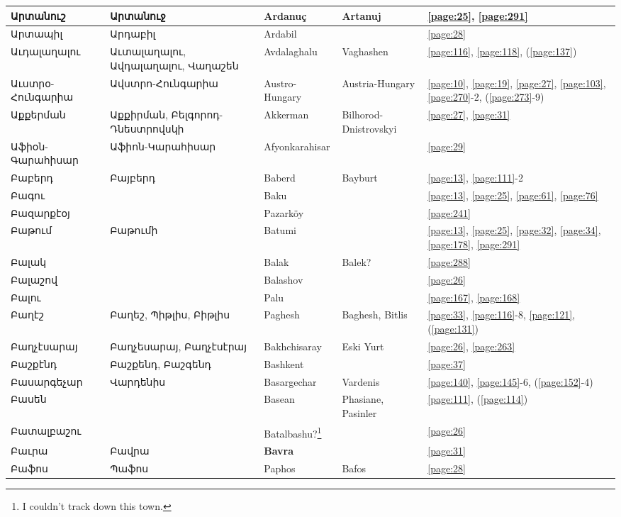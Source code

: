 \begin{center}
\begin{longtable}{|p{}|p{3cm}|p{3cm}|p{2cm}|p{3cm}|}
Արտանուշ&Արտանուջ 
& {Ardanuç}& Artanuj&\ref{page:25}, \ref{page:291}\\ \hline
Արտապիլ& Արդաբիլ&
{Ardabil}& &\ref{page:28}\\ \hline
Աւդալաղալու&Աւտալաղալու, Ավդալաղալու, Վաղաշեն &
{Avdalaghalu}&Vaghashen &\ref{page:116}, \ref{page:118}, (\ref{page:137})\\ \hline
Աւստրօ-Հունգարիա&Ավստրո-Հունգարիա
&Austro-Hungary &Austria-Hungary &\ref{page:10}, \ref{page:19}, \ref{page:27}, \ref{page:103}, \ref{page:270}-2, (\ref{page:273}-9)\\ \hline
Աքքերման&Աքքիրման,  Բելգորոդ-Դնեստրովսկի&
{Akkerman}& Bilhorod-Dnistrovskyi&\ref{page:27}, \ref{page:31}\\ \hline
Աֆիօն-Գարահիսար&Աֆիոն-Կարահիսար
& Afyonkarahisar& &\ref{page:29}\\ \hline
Բաբերդ& Բայբերդ&
{Baberd} &Bayburt &\ref{page:13}, \ref{page:111}-2\\ \hline
Բագու& &
Baku& &\ref{page:13}, \ref{page:25}, \ref{page:61}, \ref{page:76}\\ \hline
Բազարքէօյ&  
&Pazarköy& &\ref{page:241}\\ \hline
Բաթում& Բաթումի& 
{Batumi}& &\ref{page:13}, \ref{page:25}, \ref{page:32}, \ref{page:34}, \ref{page:178}, \ref{page:291}\\ \hline
Բալակ& & 
Balak & Balek?&\ref{page:288}\\ \hline
Բալաշով& &  {Balashov}& &\ref{page:26}\\ \hline
Բալու& &
{Palu}& &\ref{page:167}, \ref{page:168}\\ \hline
Բաղէշ& Բաղեշ, Պիթլիս,  Բիթլիս & {Paghesh}&Baghesh, Bitlis &\ref{page:33}, \ref{page:116}-8, \ref{page:121}, (\ref{page:131})\\ \hline
Բաղչէսարայ& Բաղչեսարայ, Բաղչէսէրայ&{Bakhchisaray} & Eski Yurt&\ref{page:26}, \ref{page:263}\\ \hline
Բաշքէնդ &Բաշքենդ, Բաշգենդ &{Bashkent} & &\ref{page:37}\\ \hline
Բասարգեչար& Վարդենիս &
{Basargechar}&Vardenis &\ref{page:140}, \ref{page:145}-6, (\ref{page:152}-4)\\ \hline
Բասեն& &Basean & 
{Phasiane},     Pasinler &\ref{page:111}, (\ref{page:114})\\ \hline
Բատալբաշու& &
{Batalbashu?}\footnote{I couldn't track down this town. }& &\ref{page:26}\\ \hline
Բաւրա& Բավրա
& \textbf{Bavra}& &\ref{page:31}\\ \hline
Բաֆոս&Պաֆոս
& {Paphos}& Bafos&\ref{page:28}\\ \hline

\end{longtable}
\end{center}
